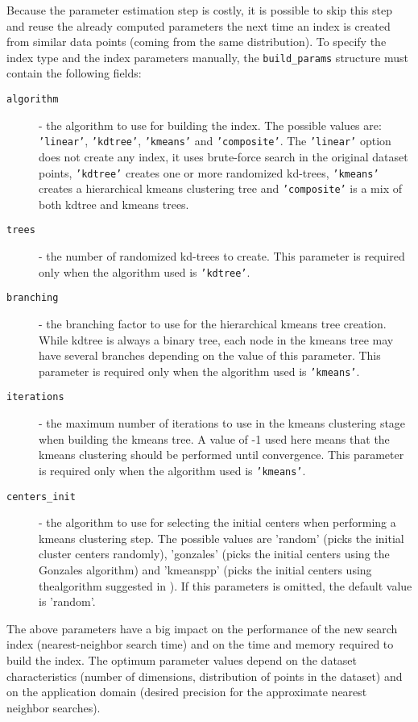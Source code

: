 \documentclass[letter,10pt]{article}
\begin{document}
Because the parameter estimation step is costly, it is
possible to skip this step and reuse the already computed parameters the
next time an index is created from similar data points (coming from the
same distribution). To specify the index type and the index parameters
manually, the \texttt{build\_params} structure must contain the following
fields:



\begin{description}
\item[\texttt{algorithm}] - the algorithm to use for building the index.
The possible values are: \texttt{'linear'}, \texttt{'kdtree'},
\texttt{'kmeans'} and \texttt{'composite'}. The \texttt{'linear'} option
does not create any index, it uses brute-force search in the original
dataset points, \texttt{'kdtree'} creates one or more randomized kd-trees,
\texttt{'kmeans'} creates a hierarchical kmeans clustering tree and
\texttt{'composite'} is a mix of both kdtree and kmeans trees.
\item[\texttt{trees}] - the number of randomized kd-trees to
create. This parameter is required only when the algorithm used is
\texttt{'kdtree'}.
\item[\texttt{branching}] - the branching factor to use for
the hierarchical kmeans tree creation. While kdtree is always a binary
tree, each node in the kmeans tree may have several branches depending on
the value of this parameter. This parameter is required only when the
algorithm used is \texttt{'kmeans'}.
\item[\texttt{iterations}] - the maximum number of iterations to
use in the kmeans clustering stage when building the kmeans tree. A value
of -1 used here means that the kmeans clustering should be performed until
convergence. This parameter is required only when the algorithm used is
\texttt{'kmeans'}.
\item[\texttt{centers\_init}] - the algorithm to use for selecting the initial
centers when performing a kmeans clustering step. The possible values are
'random' (picks the initial cluster centers randomly), 'gonzales' (picks the
initial centers using the Gonzales algorithm) and 'kmeanspp' (picks the initial
centers using thealgorithm suggested in \cite{arthur_kmeanspp_2007}). If this
parameters is omitted, the default value is 'random'.

\end{description}

The above parameters have a big impact on the performance of the new search
index (nearest-neighbor search time) and on the time and memory required to
build the index. The optimum parameter values depend on the dataset
characteristics (number of dimensions, distribution of points in the
dataset) and on the application domain (desired precision for the
approximate nearest neighbor searches).
\end{document}
